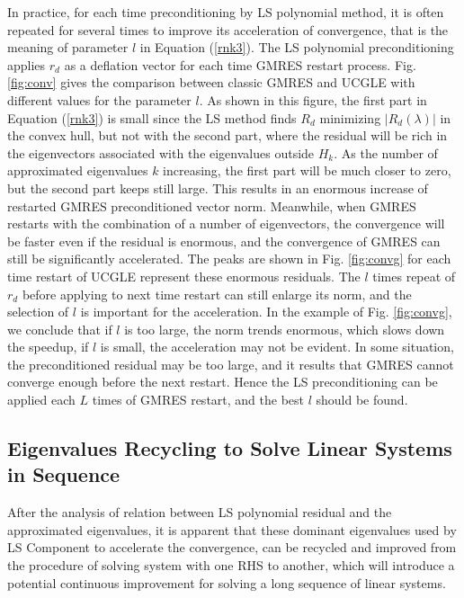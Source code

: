 In practice, for each time preconditioning by LS polynomial method, it is often repeated for several times to improve its acceleration of convergence, that is the meaning of parameter $l$ in Equation (\ref{rnk3}). The LS polynomial preconditioning applies $r_d$ as a deflation vector for each time GMRES restart process. Fig. \ref{fig:conv} gives the comparison between classic GMRES and UCGLE with different values for the parameter $l$. As shown in this figure, the first part in Equation (\ref{rnk3}) is small since the LS method finds $R_d$ minimizing $|R_d(\lambda)|$ in the convex hull, but not with the second part, where the residual will be rich in the eigenvectors associated with the eigenvalues outside $H_k$. As the number of approximated eigenvalues $k$ increasing, the first part will be much closer to zero, but the second part keeps still large. This results in an enormous increase of restarted GMRES preconditioned vector norm. Meanwhile, when GMRES restarts with the combination of a number of eigenvectors, the convergence will be faster even if the residual is enormous, and the convergence of GMRES can still be significantly accelerated. The peaks are shown in Fig. \ref{fig:convg} for each time restart of UCGLE represent these enormous residuals. The $l$ times repeat of $r_d$ before applying to next time restart can still enlarge its norm, and the selection of $l$ is important for the acceleration. In the example of Fig. \ref{fig:convg}, we conclude that if $l$ is too large, the norm trends enormous, which slows down the speedup, if $l$ is small, the acceleration may not be evident. In some situation, the preconditioned residual may be too large, and it results that GMRES cannot converge enough before the next restart. Hence the LS preconditioning can be applied each $L$ times of GMRES restart, and the best $l$ should be found.

\subsection {Eigenvalues Recycling to Solve Linear Systems in Sequence}

After the analysis of relation between LS polynomial residual and the approximated eigenvalues, it is apparent that these dominant eigenvalues used by LS Component to accelerate the convergence, can be recycled and improved from the procedure of solving system with one RHS to another, which will introduce a potential continuous improvement for solving a long sequence of linear systems.

